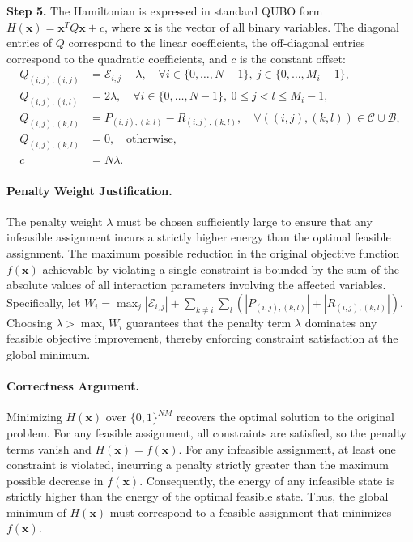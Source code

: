 \documentclass[12pt]{article}
\begin{document}
\textbf{Step 5.} The Hamiltonian is expressed in standard QUBO form $H(\mathbf{x}) = \mathbf{x}^T Q \mathbf{x} + c$, where $\mathbf{x}$ is the vector of all binary variables. The diagonal entries of $Q$ correspond to the linear coefficients, the off-diagonal entries correspond to the quadratic coefficients, and $c$ is the constant offset:
\begin{align}
  Q_{(i,j),(i,j)} &= \mathcal{E}_{i,j} - \lambda, \quad \forall i \in \{0,\dots,N-1\}, \ j \in \{0,\dots,M_i-1\}, \\
  Q_{(i,j),(i,l)} &= 2\lambda, \quad \forall i \in \{0,\dots,N-1\}, \ 0 \le j < l \le M_i-1, \\
  Q_{(i,j),(k,l)} &= P_{(i,j),(k,l)} - R_{(i,j),(k,l)}, \quad \forall ((i,j),(k,l)) \in \mathcal{C} \cup \mathcal{B}, \\
  Q_{(i,j),(k,l)} &= 0, \quad \text{otherwise}, \\
  c &= N\lambda.
\end{align}

\paragraph{Penalty Weight Justification.}
The penalty weight $\lambda$ must be chosen sufficiently large to ensure that any infeasible assignment incurs a strictly higher energy than the optimal feasible assignment. The maximum possible reduction in the original objective function $f(\mathbf{x})$ achievable by violating a single constraint is bounded by the sum of the absolute values of all interaction parameters involving the affected variables. Specifically, let $W_i = \max_{j} |\mathcal{E}_{i,j}| + \sum_{k \neq i} \sum_{l} (|P_{(i,j),(k,l)}| + |R_{(i,j),(k,l)}|)$. Choosing $\lambda > \max_i W_i$ guarantees that the penalty term $\lambda$ dominates any feasible objective improvement, thereby enforcing constraint satisfaction at the global minimum.

\paragraph{Correctness Argument.}
Minimizing $H(\mathbf{x})$ over $\{0,1\}^{NM}$ recovers the optimal solution to the original problem. For any feasible assignment, all constraints are satisfied, so the penalty terms vanish and $H(\mathbf{x}) = f(\mathbf{x})$. For any infeasible assignment, at least one constraint is violated, incurring a penalty strictly greater than the maximum possible decrease in $f(\mathbf{x})$. Consequently, the energy of any infeasible state is strictly higher than the energy of the optimal feasible state. Thus, the global minimum of $H(\mathbf{x})$ must correspond to a feasible assignment that minimizes $f(\mathbf{x})$.
\end{document}
